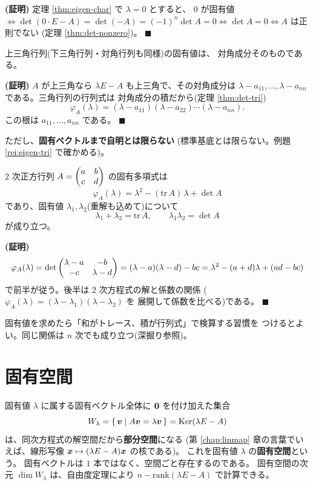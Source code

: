 \noindent\textbf{(証明)}\quad
定理 \ref{thm:eigen-char} で $\lambda = 0$ とすると、
$0$ が固有値 $\iff \det(0 \cdot E - A) = \det(-A) = (-1)^n \det A = 0
\iff \det A = 0 \iff A$ は正則でない
(定理 \ref{thm:det-nonzero})。 $\blacksquare$

\begin{teiri}[三角行列の固有値]\label{thm:eigen-tri}
上三角行列(下三角行列・対角行列も同様)の固有値は、
対角成分そのものである。
\end{teiri}

\noindent\textbf{(証明)}\quad
$A$ が上三角なら $\lambda E - A$ も上三角で、その対角成分は
$\lambda - a_{11}, \dots, \lambda - a_{nn}$ である。三角行列の行列式は
対角成分の積だから(定理 \ref{thm:det-tri})
\[
\varphi_A(\lambda) = (\lambda - a_{11})(\lambda - a_{22})\cdots(\lambda - a_{nn}).
\]
この根は $a_{11}, \dots, a_{nn}$ である。 $\blacksquare$

ただし、\textbf{固有ベクトルまで自明とは限らない}
(標準基底とは限らない。例題 \ref{rei:eigen-tri} で確かめる)。

\begin{teiri}\label{thm:eigen-trdet2}
$2$ 次正方行列 $A = \begin{pmatrix}a & b \\ c & d\end{pmatrix}$ の固有多項式は
\[
\varphi_A(\lambda) = \lambda^2 - (\mathrm{tr}\,A)\,\lambda + \det A
\]
であり、固有値 $\lambda_1, \lambda_2$(重解も込めて)について
\[
\lambda_1 + \lambda_2 = \mathrm{tr}\,A, \qquad
\lambda_1 \lambda_2 = \det A
\]
が成り立つ。
\end{teiri}

\noindent\textbf{(証明)}\quad
\[
\varphi_A(\lambda) = \det\begin{pmatrix}\lambda - a & -b \\ -c & \lambda - d\end{pmatrix}
= (\lambda - a)(\lambda - d) - bc
= \lambda^2 - (a + d)\lambda + (ad - bc)
\]
で前半が従う。後半は $2$ 次方程式の解と係数の関係
($\varphi_A(\lambda) = (\lambda - \lambda_1)(\lambda - \lambda_2)$ を
展開して係数を比べる)である。 $\blacksquare$

固有値を求めたら「和がトレース、積が行列式」で検算する習慣を
つけるとよい。同じ関係は $n$ 次でも成り立つ(深掘り参照)。

\section{固有空間}

固有値 $\lambda$ に属する固有ベクトル全体に $\bm{0}$ を付け加えた集合
\[
W_\lambda = \{\, \bm{v} \mid A\bm{v} = \lambda\bm{v} \,\}
= \mathrm{Ker}(\lambda E - A)
\]
は、同次方程式の解空間だから\textbf{部分空間}になる
(第 \ref{chap:linmap} 章の言葉でいえば、線形写像
$\bm{x} \mapsto (\lambda E - A)\bm{x}$ の核である)。
これを固有値 $\lambda$ の\textbf{固有空間}という。
固有ベクトルは $1$ 本ではなく、空間ごと存在するのである。
固有空間の次元 $\dim W_\lambda$ は、自由度定理により
$n - \mathrm{rank}(\lambda E - A)$ で計算できる。

